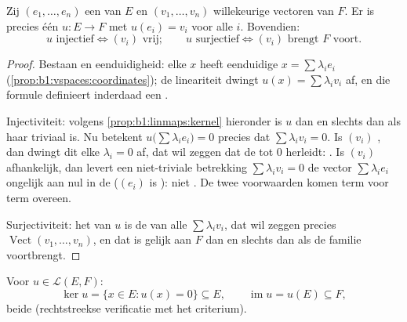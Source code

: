 \begin{proposition}\label{prop:b1:linmaps:basis}
Zij $(e_1, \dots, e_n)$ een  van $E$ en $(v_1, \dots, v_n)$
willekeurige vectoren van $F$. Er is precies één  $u \colon E \to F$ met $u(e_i) = v_i$ voor alle $i$.
Bovendien:
\[
u \text{ injectief} \iff (v_i) \text{ vrij};
\qquad
u \text{ surjectief} \iff (v_i) \text{ brengt } F \text{ voort} .
\]
\end{proposition}

\begin{proof}
Bestaan en eenduidigheid: elke $x$ heeft eenduidige  $x
= \sum \lambda_i e_i$ (\cref{prop:b1:vspaces:coordinates}); de
lineariteit dwingt $u(x) = \sum \lambda_i v_i$ af, en die formule
definieert inderdaad een .

Injectiviteit: volgens \cref{prop:b1:linmaps:kernel} hieronder is
$u$  dan en slechts dan als haar  triviaal is. Nu
betekent $u\bigl(\sum\lambda_i e_i\bigr) = 0$ precies dat
$\sum\lambda_i v_i = 0$. Is $(v_i)$ , dan dwingt dit elke
$\lambda_i = 0$ af, dat wil zeggen dat de  tot $0$ herleidt:
. Is $(v_i)$ afhankelijk, dan levert een niet-triviale
betrekking $\sum\lambda_i v_i = 0$ de vector $\sum\lambda_i e_i$
ongelijk aan nul in de  ($(e_i)$ is ): niet . De
twee voorwaarden komen term voor term overeen.

Surjectiviteit: het  van $u$ is de  van alle
$\sum\lambda_i v_i$, dat wil zeggen precies
$\operatorname{Vect}(v_1, \dots, v_n)$, en dat is gelijk aan $F$
dan en slechts dan als de familie voortbrengt.
\end{proof}

\begin{definition}\label{def:b1:linmaps:kerim}
Voor $u \in \mathcal{L}(E, F)$:
\[
\ker u = \{x \in E : u(x) = 0\} \subseteq E,
\qquad
\operatorname{im} u = u(E) \subseteq F ,
\]
beide  (rechtstreekse verificatie met het
criterium).
\end{definition}

